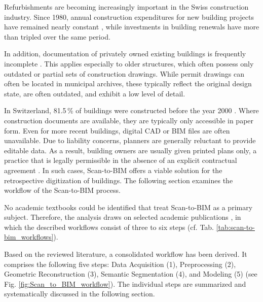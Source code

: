 \begin{English}
    Refurbishments are becoming increasingly important in the Swiss construction industry. Since 1980, annual construction expenditures for new building projects have remained nearly constant \cite{bundesamtfuerstatstikBauausgabenNachArt}, while investments in building renewals have more than tripled over the same period. 
    
    In addition, documentation of privately owned existing buildings is frequently incomplete \cite{dewolfCircularBuiltEnvironment, kadenLeitfadenGeodaesieUnd}. This applies especially to older structures, which often possess only outdated or partial sets of construction drawings. While permit drawings can often be located in municipal archives, these typically reflect the original design state, are often outdated, and exhibit a low level of detail.
    
    In Switzerland, 81.5\,\% of buildings were constructed before the year 2000 \cite{bundesamtfuerstatstikBauperiode}. Where construction documents are available, they are typically only accessible in paper form. Even for more recent buildings, digital CAD or BIM files are often unavailable. Due to liability concerns, planners are generally reluctant to provide editable data. As a result, building owners are usually given printed plans only, a practice that is legally permissible in the absence of an explicit contractual agreement \cite{bundschwBauenRechtenUnd}. In such cases, Scan-to-BIM offers a viable solution for the retrospective digitization of buildings. The following section examines the workflow of the Scan-to-BIM process.

    No academic textbooks could be identified that treat Scan-to-BIM as a primary subject. Therefore, the analysis draws on selected academic publications \cite{wangApplicationOrientedScantoBIM2019, badenkoSCANTOBIMMETHODOLOGYADAPTED2019, borrusoProceduralPointCloud2023, rashdiScanningTechnologiesBuilding2022}, in which the described workflows consist of three to six steps (cf. Tab. \ref{tab:scan-to-bim_workflows}).

    Based on the reviewed literature, a consolidated workflow has been derived. It comprises the following five steps: Data Acquisition (1), Preprocessing (2), Geometric Reconstruction (3), Semantic Segmentation (4), and Modeling (5) (see Fig. \ref{fig:Scan_to_BIM_workflow}). The individual steps are summarized and systematically discussed in the following section.
\end{English}

